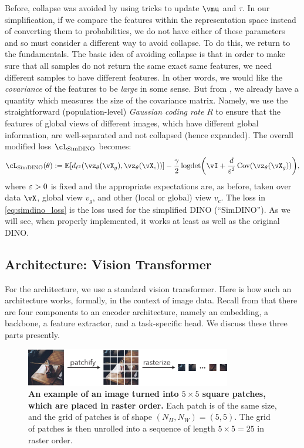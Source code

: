 \documentclass[../../book-main.tex]{subfiles}
\begin{document}
Before, collapse was avoided by using tricks to update \(\vmu\) and \(\tau\). In our simplification, if we compare the features within the representation space instead of converting them to probabilities, we do not have either of these parameters and so must consider a different way to avoid collapse. To do this, we return to the fundamentals. The basic idea of avoiding collapse is that in order to make sure that all samples do not return the same exact same features, we need different samples to have different features. In other words, we would like the \textit{covariance} of the features to be \textit{large} in some sense. But from , we already have a quantity which measures the size of the covariance matrix. Namely, we use the straightforward (population-level) \textit{Gaussian coding rate} \(R\) to ensure that the features of global views of different images, which have different global information, are well-separated and not collapsed (hence expanded). The overall modified loss \(\cL_{\simdino}\) becomes:
\begin{equation}\label{eq:simdino_loss}
    \cL_{\simdino}(\theta) := \Ex[d_{\ell^{2}}(\vz_{\theta}(\vX_{g}), \vz_{\theta}(\vX_{c}))] - \frac{\gamma}{2}\logdet\rp{\vI + \frac{d}{\eps^{2}}\Cov(\vz_{\theta}(\vX_{g}))},
\end{equation}
where \(\varepsilon > 0\) is fixed and the appropriate expectations are, as before, taken over data \(\vX\), global view \(v_{g}\), and other (local or global) view \(v_{c}\). The loss in \eqref{eq:simdino_loss} is the loss used for the simplified DINO (``SimDINO''). As we will see, when properly implemented, it works at least as well as the original DINO.

\subsection{Architecture: Vision Transformer}\label{sub:contrastive_learning_architecture}

For the architecture, we use a standard vision transformer. Here is how such an architecture works, formally, in the context of image data. Recall from  that there are four components to an encoder architecture, namely an embedding, a backbone, a feature extractor, and a task-specific head. We discuss these three parts presently.

\begin{figure}
    \centering 
    \includegraphics[width=0.8\textwidth]{chapters/chapter7/figs/patchify.pdf}
    \caption{\small\textbf{An example of an image turned into \(5 \times 5\) square patches, which are placed in raster order.} Each patch is of the same size, and the grid of patches is of shape \((N_{H}, N_{W}) = (5, 5)\). The grid of patches is then unrolled into a sequence of length \(5 \times 5 = 25\) in raster order.}
    \label{fig:patchify_rasterize}
\end{figure}
\end{document}
